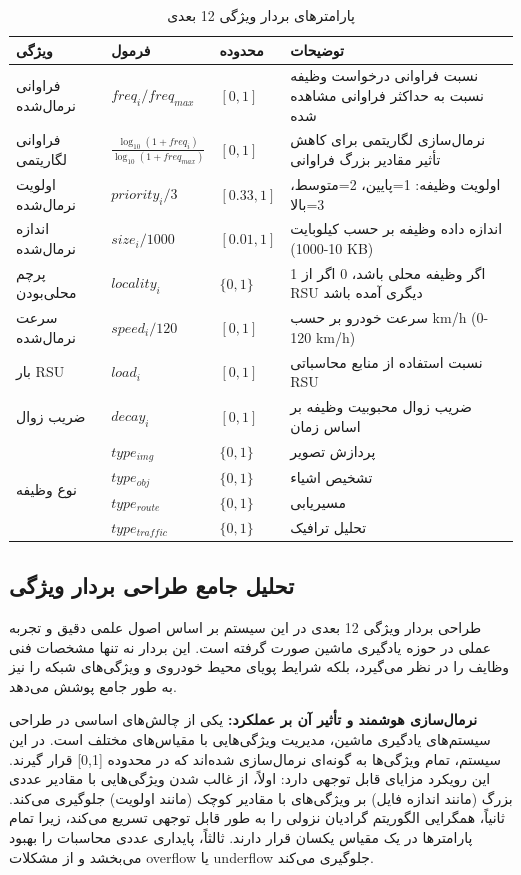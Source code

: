 \documentclass[11pt]{article}
\begin{document}
\begin{table}[h]
\centering
\begin{tabular}{|p{2.5cm}|p{3cm}|p{2cm}|p{6cm}|}
\hline
\textbf{ویژگی} & \textbf{فرمول} & \textbf{محدوده} & \textbf{توضیحات} \\
\hline
فراوانی نرمال‌شده & $freq_i / freq_{max}$ & $[0, 1]$ & نسبت فراوانی درخواست وظیفه نسبت به حداکثر فراوانی مشاهده شده \\
\hline
فراوانی لگاریتمی & $\frac{\log_{10}(1 + freq_i)}{\log_{10}(1 + freq_{max})}$ & $[0, 1]$ & نرمال‌سازی لگاریتمی برای کاهش تأثیر مقادیر بزرگ فراوانی \\
\hline
اولویت نرمال‌شده & $priority_i / 3$ & $[0.33, 1]$ & اولویت وظیفه: 1=پایین، 2=متوسط، 3=بالا \\
\hline
اندازه نرمال‌شده & $size_i / 1000$ & $[0.01, 1]$ & اندازه داده وظیفه بر حسب کیلوبایت (10-1000 KB) \\
\hline
پرچم محلی‌بودن & $locality_i$ & $\{0, 1\}$ & 1 اگر وظیفه محلی باشد، 0 اگر از RSU دیگری آمده باشد \\
\hline
سرعت نرمال‌شده & $speed_i / 120$ & $[0, 1]$ & سرعت خودرو بر حسب km/h (0-120 km/h) \\
\hline
بار RSU & $load_i$ & $[0, 1]$ & نسبت استفاده از منابع محاسباتی RSU \\
\hline
ضریب زوال & $decay_i$ & $[0, 1]$ & ضریب زوال محبوبیت وظیفه بر اساس زمان \\
\hline
\multirow{4}{*}{نوع وظیفه} & $type_{img}$ & $\{0, 1\}$ & پردازش تصویر \\
\cline{2-4}
& $type_{obj}$ & $\{0, 1\}$ & تشخیص اشیاء \\
\cline{2-4}
& $type_{route}$ & $\{0, 1\}$ & مسیریابی \\
\cline{2-4}
& $type_{traffic}$ & $\{0, 1\}$ & تحلیل ترافیک \\
\hline
\end{tabular}
\caption{پارامترهای بردار ویژگی 12 بعدی}
\end{table}

\subsection{تحلیل جامع طراحی بردار ویژگی}

طراحی بردار ویژگی 12 بعدی در این سیستم بر اساس اصول علمی دقیق و تجربه عملی در حوزه یادگیری ماشین صورت گرفته است. این بردار نه تنها مشخصات فنی وظایف را در نظر می‌گیرد، بلکه شرایط پویای محیط خودروی و ویژگی‌های شبکه را نیز به طور جامع پوشش می‌دهد.

\textbf{نرمال‌سازی هوشمند و تأثیر آن بر عملکرد:} یکی از چالش‌های اساسی در طراحی سیستم‌های یادگیری ماشین، مدیریت ویژگی‌هایی با مقیاس‌های مختلف است. در این سیستم، تمام ویژگی‌ها به گونه‌ای نرمال‌سازی شده‌اند که در محدوده [0,1] قرار گیرند. این رویکرد مزایای قابل توجهی دارد: اولاً، از غالب شدن ویژگی‌هایی با مقادیر عددی بزرگ (مانند اندازه فایل) بر ویژگی‌های با مقادیر کوچک (مانند اولویت) جلوگیری می‌کند. ثانیاً، همگرایی الگوریتم گرادیان نزولی را به طور قابل توجهی تسریع می‌کند، زیرا تمام پارامترها در یک مقیاس یکسان قرار دارند. ثالثاً، پایداری عددی محاسبات را بهبود می‌بخشد و از مشکلات overflow یا underflow جلوگیری می‌کند.
\end{document}
